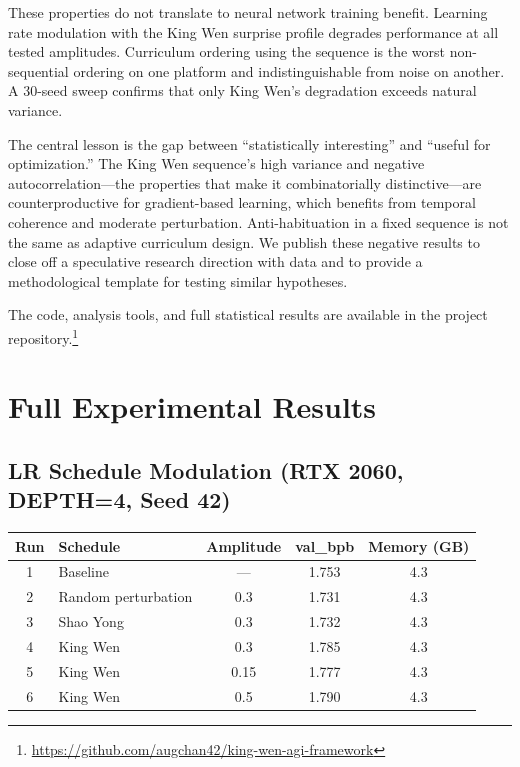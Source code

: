 \documentclass{article}
\begin{document}
These properties do not translate to neural network training benefit. Learning rate modulation with the King Wen surprise profile degrades performance at all tested amplitudes. Curriculum ordering using the sequence is the worst non-sequential ordering on one platform and indistinguishable from noise on another. A 30-seed sweep confirms that only King Wen's degradation exceeds natural variance.

The central lesson is the gap between ``statistically interesting'' and ``useful for optimization.'' The King Wen sequence's high variance and negative autocorrelation---the properties that make it combinatorially distinctive---are counterproductive for gradient-based learning, which benefits from temporal coherence and moderate perturbation. Anti-habituation in a fixed sequence is not the same as adaptive curriculum design. We publish these negative results to close off a speculative research direction with data and to provide a methodological template for testing similar hypotheses.

The code, analysis tools, and full statistical results are available in the project repository.\footnote{\url{https://github.com/augchan42/king-wen-agi-framework}}




\newpage

\appendix
\section{Full Experimental Results}\label{app:results}

\subsection{LR Schedule Modulation (RTX 2060, DEPTH=4, Seed 42)}

\begin{table}[h]
\centering
\begin{tabular}{clccc}
\toprule
\textbf{Run} & \textbf{Schedule} & \textbf{Amplitude} & \textbf{val\_bpb} & \textbf{Memory (GB)} \\
\midrule
1 & Baseline & --- & 1.753 & 4.3 \\
2 & Random perturbation & 0.3 & 1.731 & 4.3 \\
3 & Shao Yong & 0.3 & 1.732 & 4.3 \\
4 & King Wen & 0.3 & 1.785 & 4.3 \\
5 & King Wen & 0.15 & 1.777 & 4.3 \\
6 & King Wen & 0.5 & 1.790 & 4.3 \\
\bottomrule
\end{tabular}
\end{table}
\end{document}
